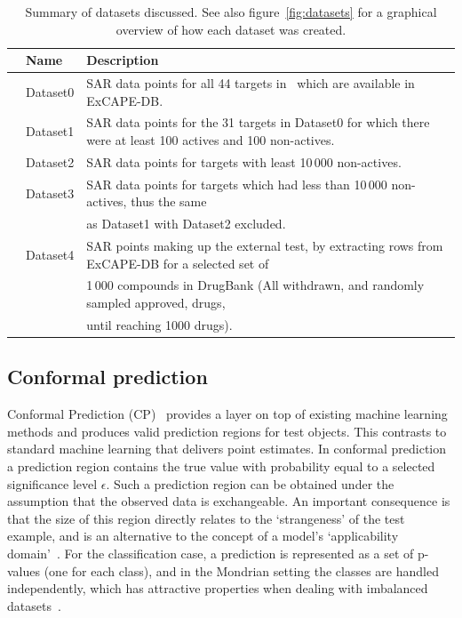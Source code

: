 \documentclass[utf8]{frontiersSCNS} %
\begin{document}
\begin{table}[h]
\small
\centering
\caption{Summary of datasets discussed. See also figure~\ref{fig:datasets}
    for a graphical overview of how each dataset was created.}
\label{tbl:datasets}
\begin{tabular}{rll}
\toprule
& Name     & Description \\
\midrule
& Dataset0 & SAR data points for all 44 targets in~\cite{Bowes2012} which are available in ExCAPE-DB. \\
& Dataset1 & SAR data points for the 31 targets in Dataset0 for which there were at least 100 actives and 100 non-actives. \\
& Dataset2 & SAR data points for targets with least 10\,000 non-actives. \\
& Dataset3 & SAR data points for targets which had less than 10\,000 non-actives, thus the same \\
&          & as Dataset1 with Dataset2 excluded. \\
& Dataset4 & SAR points making up the external test, by extracting rows from ExCAPE-DB for a selected set of \\
&          & 1\,000 compounds in DrugBank (All withdrawn, and randomly sampled approved, drugs,\\
&          & until reaching 1000 drugs). \\
\bottomrule
\end{tabular}
\end{table}

\subsection{Conformal prediction}
Conformal Prediction (CP)~\cite{Vovk2005} provides a layer on top of
existing machine learning methods and produces valid prediction regions for test
objects. This contrasts to standard machine learning that delivers point
estimates. In conformal prediction a prediction region contains the true
value with probability equal to a selected significance level $\epsilon$. Such
a prediction region can be obtained under the assumption that the observed data
is exchangeable. An important consequence is that the size of this region directly
relates to the `strangeness' of the test example, and is an alternative to the
concept of a model's `applicability domain'~\cite{norinder2014introducing}. For
the classification case, a prediction is represented as a set of p-values (one for each
class), and in the Mondrian setting the classes are handled independently,
which has attractive properties when dealing with imbalanced
datasets~\cite{Norinder:2017qc,Sun:2017qm}. 
\end{document}
